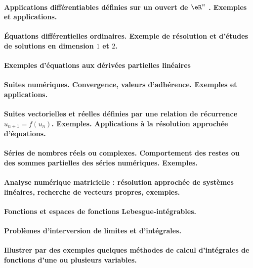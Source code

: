 \paragraph{Applications différentiables définies sur un ouvert de $\eR^n$ . Exemples et applications.}
\paragraph{Équations différentielles ordinaires. Exemple de résolution et d'études de solutions en dimension \( 1\) et \( 2\).}
\paragraph{Exemples d'équations aux dérivées partielles linéaires}
\paragraph{Suites numériques. Convergence, valeurs d'adhérence. Exemples et applications.}
\paragraph{Suites vectorielles et réelles définies par une relation de récurrence \( u_{n+1}=f(u_n)\). Exemples. Applications à la résolution approchée d'équations.}
\paragraph{Séries  de  nombres  réels  ou  complexes. Comportement  des  restes  ou  des sommes partielles des séries numériques. Exemples.}
\paragraph{Analyse numérique matricielle : résolution approchée de systèmes linéaires, recherche de vecteurs propres, exemples.}
\paragraph{Fonctions et espaces de fonctions Lebesgue-intégrables.}
\paragraph{Problèmes d'interversion de limites et d'intégrales.}
\paragraph{Illustrer par des exemples quelques méthodes de calcul d'intégrales de fonctions d'une ou plusieurs variables.}
